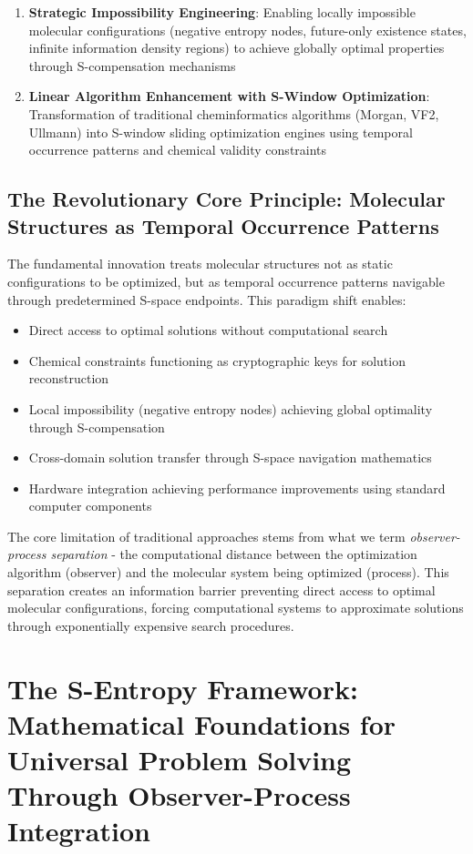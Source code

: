 \documentclass[11pt,a4paper]{article}
\begin{document}
\begin{enumerate}
\item \textbf{Strategic Impossibility Engineering}: Enabling locally impossible molecular configurations (negative entropy nodes, future-only existence states, infinite information density regions) to achieve globally optimal properties through S-compensation mechanisms

\item \textbf{Linear Algorithm Enhancement with S-Window Optimization}: Transformation of traditional cheminformatics algorithms (Morgan, VF2, Ullmann) into S-window sliding optimization engines using temporal occurrence patterns and chemical validity constraints
\end{enumerate}

\subsection{The Revolutionary Core Principle: Molecular Structures as Temporal Occurrence Patterns}

The fundamental innovation treats molecular structures not as static configurations to be optimized, but as temporal occurrence patterns navigable through predetermined S-space endpoints. This paradigm shift enables:

\begin{itemize}
\item Direct access to optimal solutions without computational search
\item Chemical constraints functioning as cryptographic keys for solution reconstruction
\item Local impossibility (negative entropy nodes) achieving global optimality through S-compensation
\item Cross-domain solution transfer through S-space navigation mathematics
\item Hardware integration achieving performance improvements using standard computer components
\end{itemize}

The core limitation of traditional approaches stems from what we term \textit{observer-process separation} - the computational distance between the optimization algorithm (observer) and the molecular system being optimized (process). This separation creates an information barrier preventing direct access to optimal molecular configurations, forcing computational systems to approximate solutions through exponentially expensive search procedures.

\section{The S-Entropy Framework: Mathematical Foundations for Universal Problem Solving Through Observer-Process Integration}
\end{document}
